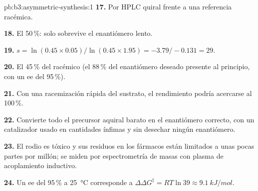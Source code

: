 \begin{solution}{pb:b3:asymmetric-synthesis:1}
\textbf{17.} Por HPLC quiral frente a una referencia racémica.

\textbf{18.} El 50\,\%: solo sobrevive el enantiómero lento.

\textbf{19.} $s = \ln(0.45 \times 0.05)/\ln(0.45 \times 1.95) = -3.79/-0.131 = 29$.

\textbf{20.} El 45\,\% del racémico (el 88\,\% del enantiómero deseado presente al principio,
con un ee del 95\,\%).

\textbf{21.} Con una racemización rápida del sustrato, el rendimiento podría acercarse al 100\,\%.

\textbf{22.} Convierte todo el precursor aquiral barato en el enantiómero correcto,
con un catalizador usado en cantidades ínfimas y sin desechar ningún enantiómero.

\textbf{23.} El rodio es tóxico y sus residuos en los fármacos están limitados a unas pocas partes por
millón; se miden por espectrometría de masas con plasma de acoplamiento inductivo.

\textbf{24.} Un ee del 95\,\% a \qty{25}{\celsius} corresponde a $\Delta\Delta G^\ddagger = RT\ln 39 \approx \qty{9.1}{kJ/mol}$.
\end{solution}
